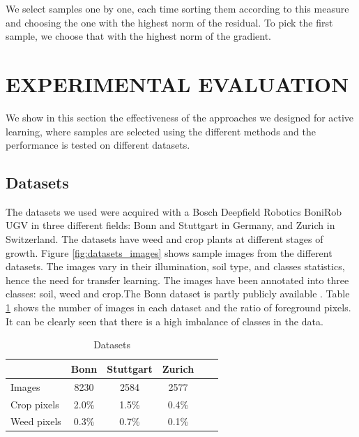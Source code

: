 \documentclass[letterpaper, 10 pt, conference]{ieeeconf}  %
\begin{document}
We select samples one by one, each time sorting them according to this measure and choosing the one with the highest norm of the residual. To pick the first sample, we choose that with the highest norm of the gradient.



\section{EXPERIMENTAL EVALUATION}
\label{sec:exp}


We show in this section the effectiveness of the approaches we designed for active learning, where samples are selected using the different methods and the performance is tested on different datasets. 


\subsection{Datasets}

The datasets we used were acquired with a Bosch Deepfield Robotics BoniRob UGV in three different fields: Bonn and Stuttgart in Germany, and Zurich in Switzerland. The datasets have weed and crop plants at different stages of growth. Figure \ref{fig:datasets_images} shows sample images from the different datasets. The images vary in their illumination, soil type, and classes statistics, hence the need for transfer learning. The images have been annotated into three classes: soil, weed and crop.The Bonn dataset is partly publicly available \cite{chebrolu2017agricultural}. Table \ref{tab:datasets_stats} shows the number of images in each dataset and the ratio of foreground pixels. It can be clearly seen that there is a high imbalance of classes in the data.



    \begin{table}
        \centering
        \caption{Datasets}
        \begin{tabular}{@{}lccccc@{}} 
            \toprule
              & Bonn & Stuttgart & Zurich \\ 
            \midrule 
    		  Images  & 8230 & 2584 & 2577 \\ \addlinespace
    		  Crop pixels & 2.0\% & 1.5\% & 0.4\%  \\ \addlinespace
    		  Weed pixels & 0.3\% & 0.7\% & 0.1\%  \\    
            \bottomrule
        \end{tabular}
        \label{tab:datasets_stats}
    \end{table}
    
\end{document}

